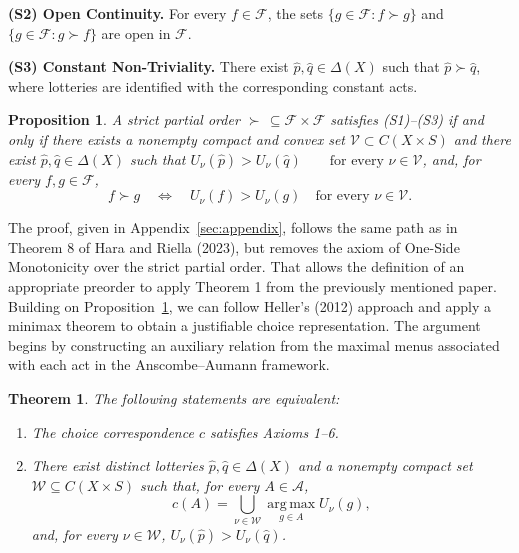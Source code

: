 \documentclass[11pt]{article}
\newtheorem{theorem}{Theorem}
\newtheorem{proposition}{Proposition}
\begin{document}
\medskip
\noindent\textbf{(S2) Open Continuity.} For every $f\in\mathcal{F}$,
the sets $\{g\in\mathcal{F}:f\succ g\}$ and
$\{g\in\mathcal{F}:g\succ f\}$ are open in $\mathcal{F}$.

\medskip
\noindent\textbf{(S3) Constant Non-Triviality.} There exist
$\hat p,\hat q\in\Delta(X)$ such that $\hat p\succ\hat q$, where lotteries
are identified with the corresponding constant acts.

\medskip
\begin{proposition}\label{prop:strict-representation}
A strict partial
order $\succ\,\subseteq\mathcal{F}\times\mathcal{F}$ satisfies
(S1)--(S3) if and only if there exists a nonempty compact and convex set
$\mathcal{V}\subset C(X\times S)$ and there exist
$\hat p,\hat q\in\Delta(X)$ such that $U_\nu(\hat p)>U_\nu(\hat q)
 \qquad\text{for every }\nu\in\mathcal{V}$,
and, for every $f,g\in\mathcal{F}$,
\[
    f\succ g
    \quad\Longleftrightarrow\quad
    U_\nu(f)>U_\nu(g)
    \quad\text{for every }\nu\in\mathcal{V}.
\]
\end{proposition}



The proof, given in Appendix~\ref{sec:appendix}, follows the same path as in Theorem 8 of Hara and Riella (2023), but removes the axiom of One-Side Monotonicity over the strict partial order. That allows the definition of an appropriate preorder to apply Theorem 1 from the previously mentioned paper. Building on Proposition~\ref{prop:strict-representation}, we can follow Heller's (2012) approach and apply a minimax theorem to obtain a justifiable choice representation. The argument begins by constructing an auxiliary relation from the maximal menus associated with each act in the Anscombe--Aumann framework.

\begin{theorem}\label{thm:justifiable-choice}
The following statements are equivalent:
\begin{enumerate}
    \item[(1)] The choice correspondence $c$ satisfies Axioms 1--6.
    \item[(2)] There exist distinct lotteries $\hat p,\hat q\in\Delta(X)$ and
    a nonempty compact set $\mathcal{W}\subseteq C(X\times S)$ such that,
    for every $A\in\mathcal{A}$,
    \[
        c(A)=\bigcup_{\nu\in\mathcal{W}}
        \operatorname*{arg\,max}_{g\in A} U_\nu(g),
    \]
    and, for every $\nu\in\mathcal{W}$,
    $U_\nu(\hat p)>U_\nu(\hat q)$.
\end{enumerate}
\end{theorem}
\end{document}

